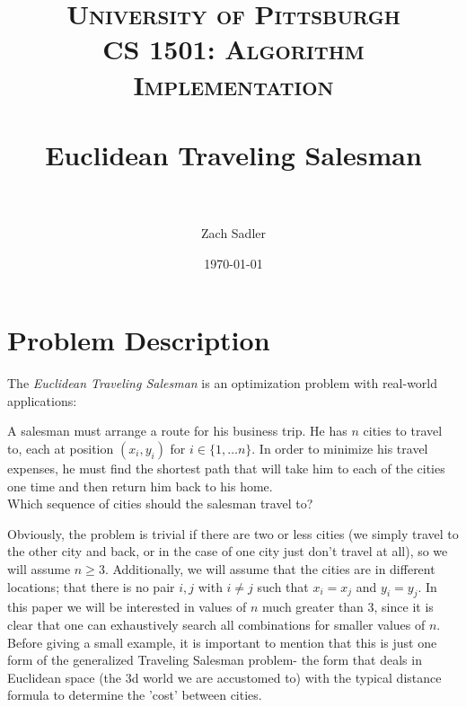 \documentclass[paper=a4, fontsize=11pt]{scrartcl} %
\title{	
\normalfont \normalsize 
\textsc{University of Pittsburgh\\
CS 1501: Algorithm Implementation} \\ [25pt] %
\horrule{0.5pt} \\[0.4cm] %
\huge Euclidean Traveling Salesman\\ %
\horrule{2pt} \\[0.5cm] %
}
\author{Zach Sadler} %
\date{\normalsize\today} %
\numberwithin{equation}{section} %
\numberwithin{figure}{section} %
\numberwithin{table}{section} %
\newenvironment{myindentpar}[1]%
     {\begin{list}{}%
             {\setlength{\leftmargin}{#1}
              \setlength{\rightmargin}{#1}
              }%
             \item[]%
     }
     {\end{list}}
\begin{document}
\maketitle %


\section{Problem Description}

The \emph{Euclidean Traveling Salesman} is an optimization problem with real-world applications:
\begin{myindentpar}{1cm}
A salesman must arrange a route for his business trip. He has $n$ cities to travel to, each at position $(x_i, y_i)$ for $i \in \{1, \dots n\}$. In order to minimize his travel expenses, he must find the shortest path that will take him to each of the cities one time and then return him back to his home. \\
Which sequence of cities should the salesman travel to?
\end{myindentpar}
%
Obviously, the problem is trivial if there are two or less cities (we simply travel to the other city and back, or in the case of one city just don't travel at all), so we will assume $n \ge 3$. Additionally, we will assume that the cities are in different locations; that there is no pair $i, j$ with $i \ne j$ such that $x_i = x_j$ and $y_i = y_j$. In this paper we will be interested in values of $n$ much greater than 3, since it is clear that one can exhaustively search all combinations for smaller values of $n$. \\
\indent Before giving a small example, it is important to mention that this is just one form of the generalized Traveling Salesman problem- the form that deals in Euclidean space (the 3d world we are accustomed to) with the typical distance formula to determine the 'cost' between cities.

\end{document}
